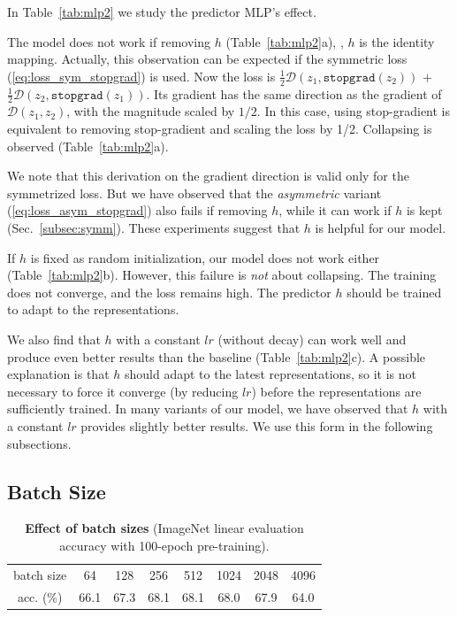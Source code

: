 \documentclass[final]{cvpr}
\newcommand{\dist}{\mathcal{D}}
\newcommand{\z}{{z}}  %
\newcommand{\tablestyle}[2]{\setlength{\tabcolsep}{#1}\renewcommand{\arraystretch}{#2}\centering\footnotesize}
\begin{document}
In Table~\ref{tab:mlp2} we study the predictor MLP's effect. 

The model does not work if removing $h$ (Table~\ref{tab:mlp2}a), \ie, $h$ is the identity mapping.
Actually, this observation can be expected if the symmetric loss (\ref{eq:loss_sym_stopgrad}) is used. Now the loss is $\frac{1}{2}\dist(\z_1, \texttt{stopgrad}(\z_2))$ ${+}$ $\frac{1}{2}\dist(\z_2, \texttt{stopgrad}(\z_1))$. Its gradient has the same direction as the gradient of $\dist(\z_1, \z_2)$, with the magnitude scaled by $1/2$. In this case, using stop-gradient is equivalent to removing stop-gradient and scaling the loss by 1/2. Collapsing is observed (Table~\ref{tab:mlp2}a).

We note that this derivation on the gradient direction is valid only for the symmetrized loss. But we have observed that the \emph{asymmetric} variant (\ref{eq:loss_asym_stopgrad}) also fails if removing $h$,  while it can work if $h$ is kept (Sec.~\ref{subsec:symm}).
These experiments suggest that $h$ is helpful for our model.

If $h$ is fixed as random initialization, our model does not work either (Table~\ref{tab:mlp2}b).
However, this failure is \emph{not} about collapsing. 
The training does not converge, and the loss remains high.
The predictor $h$ should be trained to adapt to the representations. 

We also find that $h$ with a constant $lr$ (without decay) can work well and produce even better results than the baseline (Table~\ref{tab:mlp2}c). A possible explanation is that $h$ should adapt to the latest representations, so it is not necessary to force it converge (by reducing $lr$) before the representations are sufficiently trained. In many variants of our model, we have observed that $h$ with a constant $lr$ provides slightly better results. We use this form in the following subsections.

\subsection{Batch Size} \label{subsec:batch}
 
\begin{table}[t]
\centering
\small
\tablestyle{6pt}{1.1}
\begin{tabular}{c|ccccccc}
batch size & 64 & 128 & 256 & 512 & 1024 & 2048 & 4096 \\
\shline
acc. (\%) & 66.1 & 67.3 & 68.1 & 68.1 & 68.0 & 67.9 & 64.0 \\ 
\end{tabular}
\vspace{.5em}
\caption{\textbf{Effect of batch sizes} (ImageNet linear evaluation accuracy with 100-epoch pre-training).
\label{tab:batch}
}
\end{table}
\end{document}
